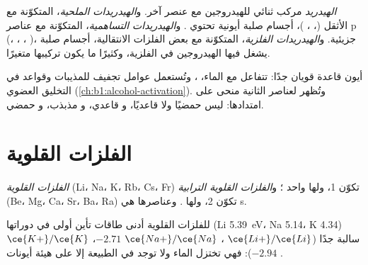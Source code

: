 \begin{definition}[الهيدريدات]\label{def:b1:s-block:hydride}
\emph{الهيدريد} مركب ثنائي للهيدروجين مع
عنصر آخر. و\emph{الهيدريدات الملحية}، المتكوّنة
مع   الأثقل (، ،
)، أجسام صلبة أيونية تحتوي . و\emph{الهيدريدات
التساهمية}، المتكوّنة مع عناصر  p
(، ، ، )، جزيئية. و\emph{الهيدريدات
الفلزية}، المتكوّنة مع بعض الفلزات الانتقالية،
أجسام صلبة يشغل فيها الهيدروجين  في 
الفلزية، وكثيرًا ما يكون تركيبها متغيرًا.
\end{definition}

أيون  قاعدة  قويان جدًا: 
تتفاعل مع الماء، ، وتُستعمل عوامل تجفيف
للمذيبات وقواعد في التخليق العضوي (\cref{ch:b1:alcohol-activation}).
وتُظهر  لعناصر  الثانية منحى
 على امتدادها:  ليس حمضيًا ولا قاعديًا، و
قاعدي، و مذبذب، و حمضي.

\section{الفلزات القلوية}

\begin{definition}\label{def:b1:s-block:families}
\emph{الفلزات القلوية} (Li، Na، K، Rb، Cs، Fr) تكوّن
 1، ولها  واحد ؛
و\emph{الفلزات القلوية الترابية} (Be، Mg، Ca، Sr،
Ba، Ra) تكوّن  2، ولها . وعناصرها هي
 s.
\end{definition}

\begin{proposition}\label{prop:b1:s-block:reducing-power}
للفلزات القلوية أدنى طاقات تأين أولى في
دوراتها (Li \qty{5.39}{eV}، Na 5.14، K 4.34)  سالبة
جدًا ($\ce{Li+}/\ce{Li}$ ، $\ce{Na+}/\ce{Na}$ $-2.71$،
$\ce{K+}/\ce{K}$ $-2.94$): فهي تختزل الماء ولا توجد في الطبيعة إلا على هيئة
أيونات .
\end{proposition}

